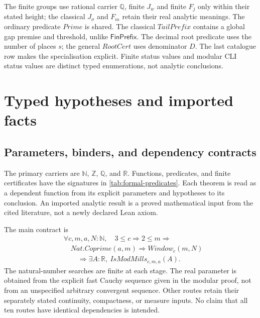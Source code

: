 \documentclass[11pt,reqno]{amsart}
\makeatletter
\newcommand{\N}{\mathbb N}
\newcommand{\Z}{\mathbb Z}
\newcommand{\Q}{\mathbb Q}
\newcommand{\R}{\mathbb R}
\theoremstyle{blueplain}
\newcounter{type}
\newcommand{\defref}[1]{\hyperref[#1]{Definition~\ref*{#1}}}
\numberwithin{equation}{section}
\DeclareRobustCommand{\defref}[1]{%
  \hyperlink{def:#1}{\ensuremath{\csname PredicateName@#1\endcsname}}}
\def\defref#1{#1}%
\def\hyperlink#1#2{#2}}
\makeatother
\begin{document}
The finite groups use rational carrier \(\Q\), finite \(J_w\) and finite
\(F_j\) only within their stated height; the classical \(J_\sigma\) and
\(F_m\) retain their real analytic meanings. The ordinary predicate
\(\defref{Prime}\) is shared. The classical \(\defref{TailPrefix}\)
contains a global gap premise and threshold, unlike \(\textsf{FinPrefix}\).
The decimal root predicate uses the number of places \(s\); the general
\(\defref{RootCert}\) uses denominator \(D\). The last catalogue row makes
the specialisation explicit. Finite status values and modular \hyperlink{abbr:CLI}{CLI} status
values are distinct typed enumerations, not analytic conclusions.

\section{Typed hypotheses and imported facts}\label{sec:axioms}
\subsection{Parameters, binders, and dependency contracts}
The primary carriers are $\N$, $\Z$, $\Q$, and $\R$. Functions, predicates,
and finite certificates have the signatures in \cref{tab:formal-predicates}.
Each theorem is read as a dependent function from its explicit parameters
and hypotheses to its conclusion. An imported analytic result is a proved
mathematical input from the cited literature, not a newly declared Lean axiom.

The main contract is
\[
\begin{aligned}
&\forall c,m,a,N:\N,\quad 3\le c\Rightarrow2\le m\Rightarrow\\
&\quad\defref{Nat.Coprime}(a,m)\Rightarrow\defref{Window}_c(m,N)\\
&\qquad\Rightarrow\exists A:\R,\ \defref{IsModMills}_{c,m,a}(A).
\end{aligned}
\]
The natural-number searches are finite at each stage. The real parameter
is obtained from the explicit fast Cauchy sequence given in the modular
proof, not from an unspecified arbitrary convergent sequence. Other routes
retain their separately stated continuity, compactness, or measure inputs.
No claim that all ten routes have identical dependencies is intended.
\end{document}
